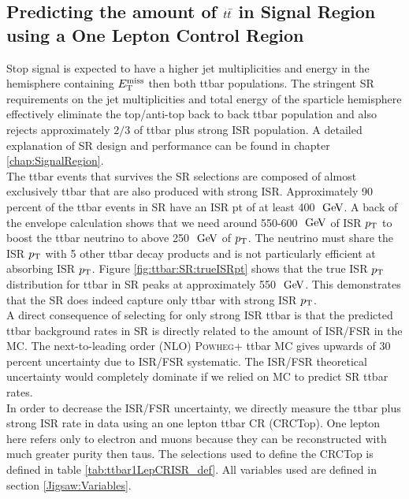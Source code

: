 \subsection{Predicting the amount of $t\bar{t}$ in Signal Region using a One Lepton Control Region}
\label{sec:Bkg:ttbar:CR}

\indent Stop signal is expected to have a higher jet multiplicities and energy in the hemisphere containing $E_{\mathrm{T}}^{\mathrm{miss}}$ then both ttbar populations.  The stringent SR requirements on the jet multiplicities and total energy of the sparticle hemisphere effectively eliminate the top/anti-top back to back ttbar population and also rejects approximately $2/3$ of ttbar plus strong ISR population.  A detailed explanation of SR design and performance can be found in chapter \ref{chap:SignalRegion}. \\

\indent The ttbar events that survives the SR selections are composed of almost exclusively ttbar that are also produced with strong ISR.  Approximately 90 percent of the ttbar events in SR have an ISR pt of at least 400 $\gev$.  A back of the envelope calculation shows that we need around 550-600 $\gev$ of ISR $p_{\mathrm{T}}$ to boost the ttbar neutrino to above 250 $\gev$ of $p_{\mathrm{T}}$.  The neutrino must share the ISR $p_{\mathrm{T}}$ with 5 other ttbar decay products and is not particularly efficient at absorbing ISR $p_{\mathrm{T}}$.  Figure \ref{fig:ttbar:SR:trueISRpt} shows that the true ISR $p_{\mathrm{T}}$ distribution for ttbar in SR peaks at approximately 550 $\gev$.  This demonstrates that the SR does indeed capture only ttbar with strong ISR $p_{\mathrm{T}}$.  \\

\indent A direct consequence of selecting for only strong ISR ttbar is that the predicted ttbar background rates in SR is directly related to the amount of ISR/FSR in the MC.  The next-to-leading order (NLO) \textsc{Powheg+} ttbar MC gives upwards of 30 percent uncertainty due to ISR/FSR systematic.  The ISR/FSR theoretical uncertainty would completely dominate if we relied on MC to predict SR ttbar rates.  \\

\indent In order to decrease the ISR/FSR uncertainty, we directly measure the ttbar plus strong ISR rate in data using an one lepton ttbar CR (CRCTop).  One lepton here refers only to electron and muons because they can be reconstructed with much greater purity then taus.  The selections used to define the CRCTop is defined in table \ref{tab:ttbar1LepCRISR_def}. All variables used are defined in section \ref{Jigsaw:Variables}. \\


